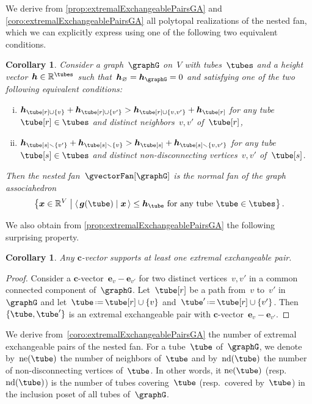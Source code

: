 \documentclass{amsart}
\newtheorem{corollary}[theorem]{Corollary}
\theoremstyle{definition}
\newcommand{\R}{\mathbb{R}} %
\renewcommand{\b}[1]{{\boldsymbol{#1}}} %
\newcommand{\set}[2]{\left\{ #1 \;\middle|\; #2 \right\}} %
\newcommand{\ssm}{\smallsetminus} %
\newcommand{\dotprod}[2]{\left\langle \, #1 \; \middle| \; #2 \, \right\rangle} %
\newcommand{\eqdef}{\mbox{\,\raisebox{0.2ex}{\scriptsize\ensuremath{\mathrm:}}\ensuremath{=}\,}} %
\newcommand{\gvector}[1]{\b{g}(#1)} %
\newcommand{\ground}{V} %
\newcommand{\nonDisconnecting}{\mathrm{nd}} %
\newcommand{\neighbors}{\mathrm{ne}} %
\begin{document}
We derive from \cref{prop:extremalExchangeablePairsGA} and \cref{coro:extremalExchangeablePairsGA} all polytopal realizations of the nested fan, which we can explicitly express using one of the following two equivalent conditions.

\begin{corollary}
Consider a graph~$\graphG$ on~$\ground$ with tubes~$\tubes$ and a height vector~$\b{h} \in \R^{\tubes}$ such that~$\b{h}_{\varnothing} = \b{h}_{\graphG} = 0$ and satisfying one of the two following equivalent conditions:
\begin{enumerate}[(i)]
\item $\b{h}_{\tube[r] \cup \{v\}} + \b{h}_{\tube[r] \cup \{v'\}} > \b{h}_{\tube[r] \cup \{v, v'\}} + \b{h}_{\tube[r]}$ for any tube~$\tube[r] \in \tubes$ and distinct neighbors~$v,v'$ of~$\tube[r]$,
\item $\b{h}_{\tube[s] \ssm \{v'\}} + \b{h}_{\tube[s] \ssm \{v\}} > \b{h}_{\tube[s]} + \b{h}_{\tube[s] \ssm \{v, v'\}}$ for any tube~$\tube[s] \in \tubes$ and distinct non-disconnecting vertices~$v,v'$ of~$\tube[s]$.
\end{enumerate}
Then the nested fan~$\gvectorFan[\graphG]$ is the normal fan of the graph associahedron
\[
\set{\b{x} \in \R^\ground}{\dotprod{\gvector{\tube}}{\b{x}} \le \b{h}_{\tube} \text{ for any tube } \tube \in \tubes}.
\]
\end{corollary}

We also obtain from \cref{prop:extremalExchangeablePairsGA} the following surprising property.

\begin{corollary}
Any $\b{c}$-vector supports at least one extremal exchangeable pair.
\end{corollary}

\begin{proof}
Consider a $\b{c}$-vector~$\b{e}_v - \b{e}_{v'}$ for two distinct vertices~$v, v'$ in a common connected component of~$\graphG$. Let~$\tube[r]$ be a path from~$v$ to~$v'$ in~$\graphG$ and let~$\tube \eqdef \tube[r] \cup \{v\}$ and~$\tube' \eqdef \tube[r] \cup \{v'\}$. Then $\{\tube, \tube'\}$ is an extremal exchangeable pair with $\b{c}$-vector~$\b{e}_v - \b{e}_{v'}$.
\end{proof}

We derive from~\cref{coro:extremalExchangeablePairsGA} the number of extremal exchangeable pairs of the nested fan.
For a tube~$\tube$ of~$\graphG$, we denote by~$\neighbors(\tube)$ the number of neighbors of~$\tube$ and by~$\nonDisconnecting(\tube)$ the number of non-disconnecting vertices of~$\tube$.
In other words, it $\neighbors(\tube)$ (resp.~$\nonDisconnecting(\tube)$) is the number of tubes covering~$\tube$ (resp.~covered by~$\tube$) in the inclusion poset of all tubes of~$\graphG$.
\end{document}
